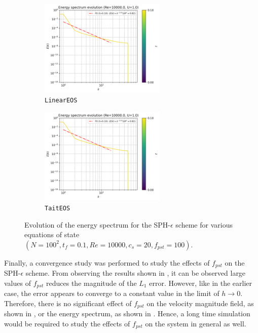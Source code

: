 \begin{figure}[htbp!]
  \begin{subfigure}{7cm}
  \centering\includegraphics[width=6cm]{Code-Figures/mon2017/eos/c0_20_linear_pec_dtmul_1_nx_100_pst_10_re_10000_mon2017/energy_spectrum_evolution.png}
  \caption{\texttt{LinearEOS}}
  \end{subfigure}
  \begin{subfigure}{7cm}
  \centering\includegraphics[width=6cm]{Code-Figures/mon2017/eos/c0_20_tait_pec_dtmul_1_nx_100_pst_10_re_10000_mon2017/energy_spectrum_evolution.png}
  \caption{\texttt{TaitEOS}}
  \end{subfigure}
  \caption{Evolution of the energy spectrum for the SPH-$\epsilon$ scheme for various equations of state $(N=100^2, t_f=0.1, Re=10000, c_s=20, f_{pst}=100)$.}
  \label{fig:sph-eps-eos-espec}
\end{figure}

Finally, a convergence study was performed to study the effects of $f_{pst}$ on the SPH-$\epsilon$ scheme. From observing the results shown in , it can be observed large values of $f_{pst}$ reduces the magnitude of the $L_1$ error. However, like in the earlier case, the error appears to converge to a constant value in the limit of $h \rightarrow 0$.
Therefore, there is no significant effect of $f_{pst}$ on the velocity magnitude field, as shown in , or the energy spectrum, as shown in .
Hence, a long time simulation would be required to study the effects of $f_{pst}$ on the system in general as well.

